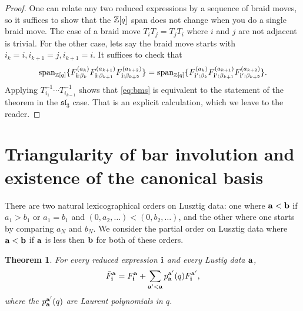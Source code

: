 \documentclass[11pt]{amsart}
\numberwithin{equation}{section}
\newtheorem{Theorem}{Theorem}[section]
\theoremstyle{definition}
\begin{document}
\begin{proof}
One can relate any two reduced expressions by a sequence of braid moves, so it suffices to show that the ${\Bbb Z}[q]$ span does not change when you do a single braid move. The case of a braid move $T_iT_j=T_jT_i$ where $i$ and $j$ are not adjacent is trivial. For the other case, lets say the braid move starts with $i_k=i, i_{k+1}=j, i_{k+1}=i$. It suffices to check that
\begin{equation} \label{eq:bms}
\text{span}_{{\Bbb Z}[q]} \{ F_{{\bf i}: {\beta_k}}^{(a_k)} F_{{\bf i}: {\beta_{k+1}}}^{(a_{k+1})} F_{{\bf i}: {\beta_{k+2}}}^{(a_{k+2})} \}= 
\text{span}_{{\Bbb Z}[q]} \{ F_{{\bf i'}: {\beta_k}}^{(a_k)} F_{{\bf i'}: {\beta_{k+1}}}^{(a_{k+1})} F_{{\bf i'}: {\beta_{k+2}}}^{(a_{k+2})} \}.
\end{equation}
Applying $T_{i_1}^{-1} \cdots T_{i_{k-1}}^{-1}$ shows that \eqref{eq:bms} is equivalent to the statement of the theorem in the $\mathfrak{sl}_3$ case. That is an explicit calculation, which we leave to the reader.
\end{proof}

\section{Triangularity of bar involution and existence of the canonical basis}

There are two natural lexicographical orders on Lusztig data: one where ${\bf a} < {\bf b}$ if $a_1 > b_1$ or $a_1=b_1$ and $(0, a_2, \ldots) < (0, b_2, \ldots)$, and the other where one starts by comparing $a_N$ and $b_N$.  
We consider the partial order on Lusztig data where ${\bf a} < {\bf b}$ if ${\bf a}$ is less then ${\bf b}$ for both of these orders. 

\begin{Theorem} \label{thm:ut}
For every reduced expression ${\bf i}$ and every Lustig data ${\bf a}$, 
$$\bar F_{\bf i}^{\bf a} = F_{\bf i}^{\bf a} + \sum_{{\bf a'}< {\bf a}} p^{\bf a'}_{{\bf a}}(q) F_{\bf i}^{{\bf a'}},$$
where the $p^{\bf a'}_{{\bf a}}(q)$ are Laurent polynomials in $q$. 
\end{Theorem}
\end{document}
